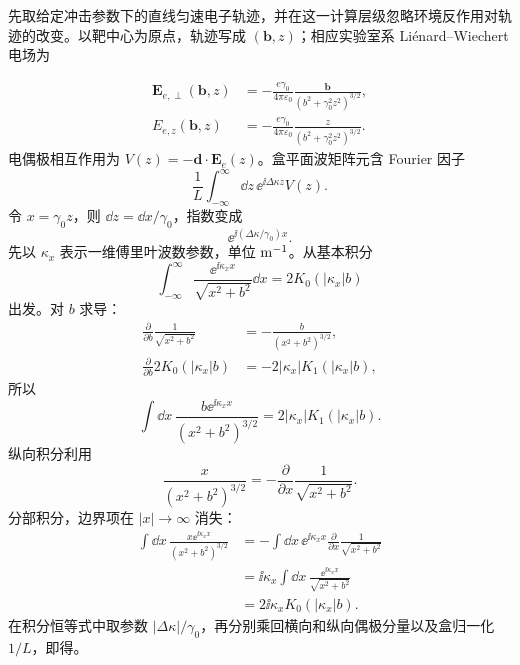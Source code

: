 \begin{derivation}
先取给定冲击参数下的直线匀速电子轨迹，并在这一计算层级忽略环境反作用对轨迹的改变。以靶中心为原点，轨迹写成 $(\mathbf b,z)$；相应实验室系 Liénard--Wiechert 电场为

\begin{align*}
\mathbf E_{e,\perp}(\mathbf b,z)
&=-\frac{e\gamma_0}{4\pi\varepsilon_0}
\frac{\mathbf b}{(b^2+\gamma_0^2z^2)^{3/2}},\\
E_{e,z}(\mathbf b,z)
&=-\frac{e\gamma_0}{4\pi\varepsilon_0}
\frac{z}{(b^2+\gamma_0^2z^2)^{3/2}}.
\end{align*}
电偶极相互作用为 $V(z)=-\mathbf d\cdot\mathbf E_e(z)$。盒平面波矩阵元含 Fourier 因子
\[
\frac1L\int_{-\infty}^{\infty}\dd z\,
\ee^{\ii\Delta\kappa z}V(z).
\]
令 $x=\gamma_0z$，则 $\dd z=\dd x/\gamma_0$，指数变成
\[
\ee^{\ii(\Delta\kappa/\gamma_0)x}.
\]
先以 $\kappa_x$ 表示一维傅里叶波数参数，单位 ${\rm m^{-1}}$。从基本积分
\[
\int_{-\infty}^{\infty}\frac{\ee^{\ii\kappa_x x}}{\sqrt{x^2+b^2}}\dd x
=2K_0(|\kappa_x|b)
\]
出发。对 $b$ 求导：
\begin{align*}
\frac{\partial}{\partial b}
\frac1{\sqrt{x^2+b^2}}
&=-\frac{b}{(x^2+b^2)^{3/2}},\\
\frac{\partial}{\partial b}2K_0(|\kappa_x|b)
&=-2|\kappa_x|K_1(|\kappa_x|b),
\end{align*}
所以
\[
\int\dd x\,
\frac{b\ee^{\ii\kappa_x x}}{(x^2+b^2)^{3/2}}
=2|\kappa_x|K_1(|\kappa_x|b).
\]
纵向积分利用
\[
\frac{x}{(x^2+b^2)^{3/2}}
=-\frac{\partial}{\partial x}
\frac1{\sqrt{x^2+b^2}}.
\]
分部积分，边界项在 $|x|\to\infty$ 消失：
\begin{align*}
\int\dd x\,
\frac{x\ee^{\ii\kappa_x x}}{(x^2+b^2)^{3/2}}
&=-\int\dd x\,\ee^{\ii\kappa_x x}
\frac{\partial}{\partial x}
\frac1{\sqrt{x^2+b^2}}\\
&=\ii\kappa_x\int\dd x\,
\frac{\ee^{\ii\kappa_x x}}{\sqrt{x^2+b^2}}\\
&=2\ii\kappa_xK_0(|\kappa_x|b).
\end{align*}
在积分恒等式中取参数 $|\Delta\kappa|/\gamma_0$，再分别乘回横向和纵向偶极分量以及盒归一化 $1/L$，即得。
\end{derivation}







